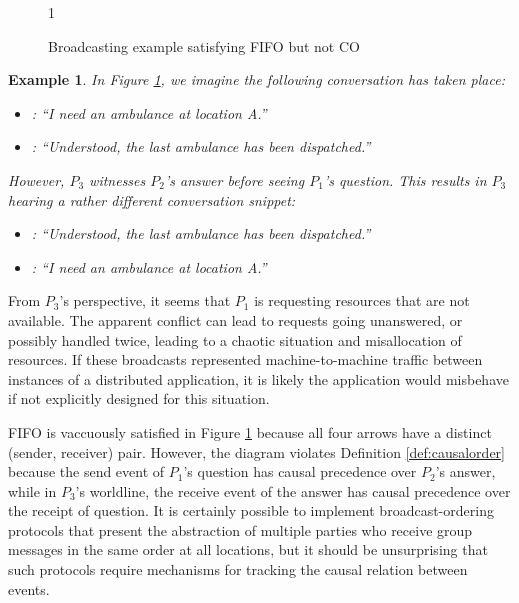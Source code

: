 \documentclass[]             %
{NASA}                       %
\newtheorem{example}{Example}
\theoremstyle{definition}
\begin{document}
\begin{figure}{1\textwidth}
  \centering 
  \caption{Broadcasting example satisfying FIFO but not CO}
  \label{fig:message-latencies-c}
\end{figure}

\begin{example}
  \label{exmpl:ambulancedispatch}
  In Figure \ref{fig:message-latencies-c}, we imagine the following
  conversation has taken place:
  \begin{itemize}
\item [$P_1$]: ``I need an ambulance at location A.''
\item [$P_2$]: ``Understood, the last ambulance has been dispatched.''
\end{itemize}
However, $P_3$ witnesses $P_2$'s answer before seeing $P_1$'s
question. This results in $P_3$ hearing a rather different conversation snippet:
\begin{itemize}
\item [$P_2$]: ``Understood, the last ambulance has been dispatched.''
\item [$P_1$]: ``I need an ambulance at location A.''
\end{itemize}
\end{example}
From $P_3$'s perspective, it seems that $P_1$ is requesting resources
that are not available. The apparent conflict can lead to requests
going unanswered, or possibly handled twice, leading to a chaotic
situation and misallocation of resources. If these broadcasts
represented machine-to-machine traffic between instances of a
distributed application, it is likely the application would misbehave
if not explicitly designed for this situation.

FIFO is vaccuously satisfied in Figure \ref{fig:message-latencies-c}
because all four arrows have a distinct (sender, receiver)
pair. However, the diagram violates Definition \ref{def:causalorder}
because the send event of $P_1$'s question has causal precedence over
$P_2$'s answer, while in $P_3$'s worldline, the receive event of the
answer has causal precedence over the receipt of question. It is
certainly possible to implement broadcast-ordering protocols that
present the abstraction of multiple parties who receive group messages
in the same order at all locations, but it should be unsurprising that
such protocols require mechanisms for tracking the causal relation
between events.
\end{document}
